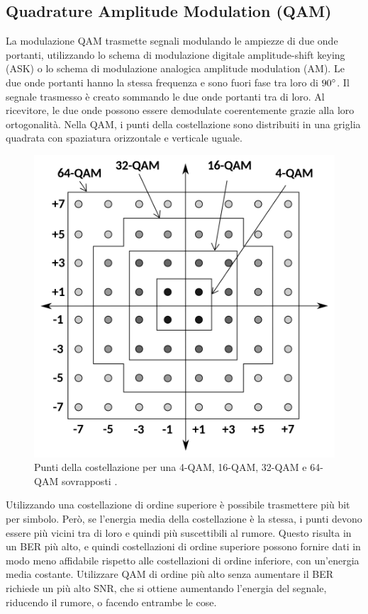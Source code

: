 \subsection{Quadrature Amplitude Modulation (QAM)}
La modulazione \ac{QAM} trasmette segnali modulando le ampiezze di due onde portanti, utilizzando lo schema di modulazione digitale amplitude-shift keying (ASK) o lo schema di modulazione analogica amplitude modulation (AM). Le due onde portanti hanno la stessa frequenza e sono fuori fase tra loro di $90\degree$.
Il segnale trasmesso è creato sommando le due onde portanti tra di loro.
Al ricevitore, le due onde possono essere demodulate coerentemente grazie alla loro ortogonalità.
Nella \ac{QAM}, i punti della costellazione sono distribuiti in una griglia quadrata con spaziatura orizzontale e verticale uguale.

\begin{figure}[htbp]
  \centering
  \includegraphics[width=0.6\linewidth]{./res/img/qam.png}
  \caption{Punti della costellazione per una 4-\ac{QAM}, 16-\ac{QAM}, 32-\ac{QAM} e 64-\ac{QAM} sovrapposti \cite{wikipedia_quadrature_nodate}.}
  \label{fig:qam-diagram}
\end{figure}

Utilizzando una costellazione di ordine superiore è possibile trasmettere più bit per simbolo.
Però, se l'energia media della costellazione è la stessa, i punti devono essere più vicini tra di loro e quindi più suscettibili al rumore.
Questo risulta in un \ac{BER} più alto, e quindi costellazioni di ordine superiore possono fornire dati in modo meno affidabile rispetto alle costellazioni di ordine inferiore, con un'energia media costante.
Utilizzare \ac{QAM} di ordine più alto senza aumentare il \ac{BER} richiede un più alto \ac{SNR}, che si ottiene aumentando l'energia del segnale, riducendo il rumore, o facendo entrambe le cose.

